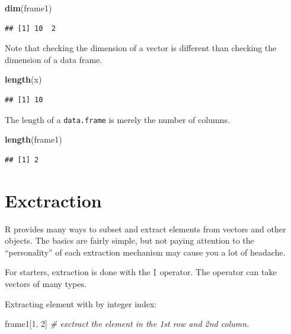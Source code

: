\documentclass[]{book}
\newenvironment{Shaded}{\begin{snugshade}}{\end{snugshade}}
\newcommand{\KeywordTok}[1]{\textcolor[rgb]{0.13,0.29,0.53}{\textbf{#1}}}
\newcommand{\DecValTok}[1]{\textcolor[rgb]{0.00,0.00,0.81}{#1}}
\newcommand{\CommentTok}[1]{\textcolor[rgb]{0.56,0.35,0.01}{\textit{#1}}}
\newcommand{\NormalTok}[1]{#1}
\theoremstyle{definition}
\theoremstyle{definition}
\theoremstyle{definition}
\theoremstyle{remark}
\begin{document}
\begin{Shaded}
\begin{Highlighting}[]
\KeywordTok{dim}\NormalTok{(frame1)                             }
\end{Highlighting}
\end{Shaded}

\begin{verbatim}
## [1] 10  2
\end{verbatim}

Note that checking the dimension of a vector is different than checking
the dimension of a data frame.

\begin{Shaded}
\begin{Highlighting}[]
\KeywordTok{length}\NormalTok{(x)}
\end{Highlighting}
\end{Shaded}

\begin{verbatim}
## [1] 10
\end{verbatim}

The length of a \texttt{data.frame} is merely the number of columns.

\begin{Shaded}
\begin{Highlighting}[]
\KeywordTok{length}\NormalTok{(frame1) }
\end{Highlighting}
\end{Shaded}

\begin{verbatim}
## [1] 2
\end{verbatim}

\section{Exctraction}\label{exctraction}

R provides many ways to subset and extract elements from vectors and
other objects. The basics are fairly simple, but not paying attention to
the ``personality'' of each extraction mechanism may cause you a lot of
headache.

For starters, extraction is done with the \texttt{{[}} operator. The
operator can take vectors of many types.

Extracting element with by integer index:

\begin{Shaded}
\begin{Highlighting}[]
\NormalTok{frame1[}\DecValTok{1}\NormalTok{, }\DecValTok{2}\NormalTok{]  }\CommentTok{# exctract the element in the 1st row and 2nd column.}
\end{Highlighting}
\end{Shaded}
\end{document}
